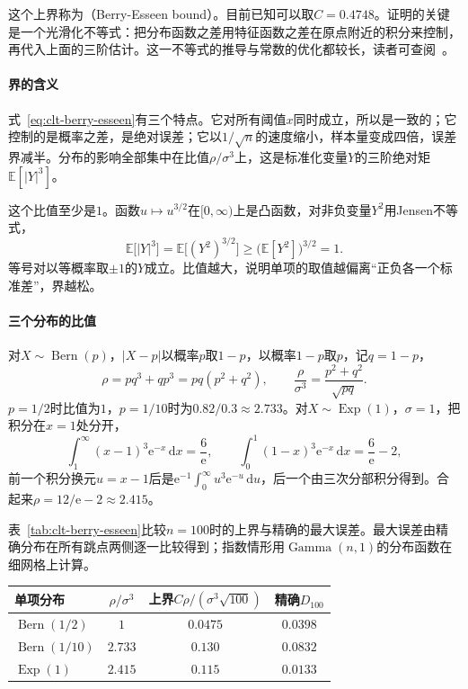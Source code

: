 这个上界称为（Berry-Esseen bound）。目前已知可以取$C=0.4748$。证明的关键是一个光滑化不等式：把分布函数之差用特征函数之差在原点附近的积分来控制，再代入上面的三阶估计。这一不等式的推导与常数的优化都较长，读者可查阅~。

\paragraph{界的含义}
式~\eqref{eq:clt-berry-esseen}有三个特点。它对所有阈值$x$同时成立，所以是一致的；它控制的是概率之差，是绝对误差；它以$1/\sqrt{n}$的速度缩小，样本量变成四倍，误差界减半。分布的影响全部集中在比值$\rho/\sigma^3$上，这是标准化变量$Y$的三阶绝对矩$\mathbb{E}[\lvert Y\rvert^3]$。

这个比值至少是$1$。函数$u\mapsto u^{3/2}$在$[0,\infty)$上是凸函数，对非负变量$Y^2$用Jensen不等式，
\[
 \mathbb{E}\bigl[\lvert Y\rvert^{3}\bigr]=\mathbb{E}\bigl[(Y^2)^{3/2}\bigr]\geq\bigl(\mathbb{E}[Y^2]\bigr)^{3/2}=1 .
\]
等号对以等概率取$\pm1$的$Y$成立。比值越大，说明单项的取值越偏离“正负各一个标准差”，界越松。

\paragraph{三个分布的比值}
对$X\sim\operatorname{Bern}(p)$，$\lvert X-p\rvert$以概率$p$取$1-p$，以概率$1-p$取$p$，记$q=1-p$，
\[
 \rho=pq^3+qp^3=pq(p^2+q^2),\qquad \frac{\rho}{\sigma^3}=\frac{p^2+q^2}{\sqrt{pq}} .
\]
$p=1/2$时比值为$1$，$p=1/10$时为$0.82/0.3\approx2.733$。对$X\sim\operatorname{Exp}(1)$，$\sigma=1$，把积分在$x=1$处分开，
\[
 \int_1^{\infty}(x-1)^3\mathrm{e}^{-x}\,\mathrm{d}x=\frac{6}{\mathrm{e}},\qquad \int_0^1(1-x)^3\mathrm{e}^{-x}\,\mathrm{d}x=\frac{6}{\mathrm{e}}-2 ,
\]
前一个积分换元$u=x-1$后是$\mathrm{e}^{-1}\int_0^\infty u^3\mathrm{e}^{-u}\,\mathrm{d}u$，后一个由三次分部积分得到。合起来$\rho=12/\mathrm{e}-2\approx2.415$。

表~\ref{tab:clt-berry-esseen}比较$n=100$时的上界与精确的最大误差。最大误差由精确分布在所有跳点两侧逐一比较得到；指数情形用$\operatorname{Gamma}(n,1)$的分布函数在细网格上计算。

\begin{BookInlineTable}
 \centering
 \caption{$n=100$时Berry--Esseen上界（$C=0.4748$）与精确最大误差$D_{100}$的比较。}
 \label{tab:clt-berry-esseen}
 \begin{tabular}{lccc}
 \toprule
 单项分布 & $\rho/\sigma^3$ & 上界$C\rho/(\sigma^3\sqrt{100})$ & 精确$D_{100}$ \\
 \midrule
 $\operatorname{Bern}(1/2)$ & $1$ & $0.0475$ & $0.0398$ \\
 $\operatorname{Bern}(1/10)$ & $2.733$ & $0.130$ & $0.0832$ \\
 $\operatorname{Exp}(1)$ & $2.415$ & $0.115$ & $0.0133$ \\
 \bottomrule
 \end{tabular}
\end{BookInlineTable}

